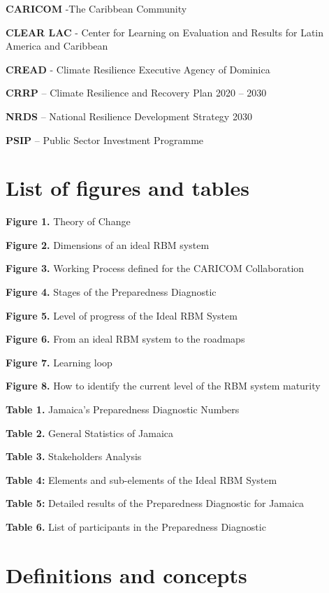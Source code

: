 \documentclass[
  10pt,
]{book}
\begin{document}
\textbf{CARICOM} -The Caribbean Community

\textbf{CLEAR LAC} - Center for Learning on Evaluation and Results for Latin America and Caribbean

\textbf{CREAD} - Climate Resilience Executive Agency of Dominica

\textbf{CRRP} -- Climate Resilience and Recovery Plan 2020 -- 2030

\textbf{NRDS} -- National Resilience Development Strategy 2030

\textbf{PSIP} -- Public Sector Investment Programme

\hypertarget{list-of-figures-and-tables}{%
\chapter*{List of figures and tables}\label{list-of-figures-and-tables}}

\textbf{Figure 1.} Theory of Change

\textbf{Figure 2.} Dimensions of an ideal RBM system

\textbf{Figure 3.} Working Process defined for the CARICOM Collaboration

\textbf{Figure 4.} Stages of the Preparedness Diagnostic

\textbf{Figure 5.} Level of progress of the Ideal RBM System

\textbf{Figure 6.} From an ideal RBM system to the roadmaps

\textbf{Figure 7.} Learning loop

\textbf{Figure 8.} How to identify the current level of the RBM system maturity

\textbf{Table 1.} Jamaica's Preparedness Diagnostic Numbers

\textbf{Table 2.} General Statistics of Jamaica

\textbf{Table 3.} Stakeholders Analysis

\textbf{Table 4:} Elements and sub-elements of the Ideal RBM System

\textbf{Table 5:} Detailed results of the Preparedness Diagnostic for Jamaica

\textbf{Table 6.} List of participants in the Preparedness Diagnostic

\hypertarget{definitions-and-concepts}{%
\chapter*{Definitions and concepts}\label{definitions-and-concepts}}
\end{document}
